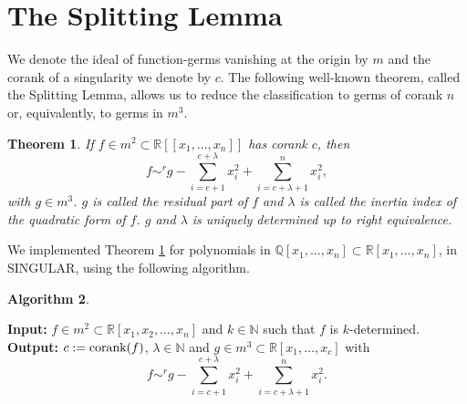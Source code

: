 \documentclass{amsproc}
\begin{document}
\section{The Splitting Lemma}
We denote the ideal of function-germs vanishing at the origin by $m$ and the corank of a singularity we denote by $c$.
The following well-known theorem, called the Splitting Lemma, allows us to reduce the classification to germs of corank $n$ or, equivalently, to germs in $m^3$.
\newtheorem{SplittingLemma}{Theorem}[section]
\newtheorem{AlgorithmSplittingLemma}[SplittingLemma]{Algorithm}
\begin{SplittingLemma}\label{SplittingLemma}
If $f\in m^2\subset \mathbb R[[x_1,\ldots,x_n]]$ has corank $c$, then
\[ f\sim^rg-\sum_{i=c+1}^{c+\lambda} x_i^2+\sum_{i=c+\lambda+1}^nx_i^2,\]
with $g\in m^3$. $g$ is called the residual part of $f$ and $\lambda$ is called the inertia index of the quadratic form of $f$. $g$ and $\lambda$ is uniquely determined up to right equivalence.
\end{SplittingLemma}
We implemented Theorem \ref{SplittingLemma} for polynomials in $\mathbb Q[x_1,\ldots,x_n]\subset\mathbb R[x_1,\ldots,x_n]$, in SINGULAR, using the following algorithm.
\begin{AlgorithmSplittingLemma} \label{AlgorithmSplittingLemma} \end{AlgorithmSplittingLemma}
\noindent\textnormal{\bf Input:} $f\in m^2\subset\mathbb R[x_1,x_2,\ldots,x_n]$ and $k\in\mathbb N$ such that $f$ is $k$-determined.\newline
\textnormal{\bf Output:} $c:=\textnormal{corank}(f)$, $\lambda\in\mathbb N$ and $g\in m^3\subset\mathbb R[x_1,\ldots,x_c]$ with \[\displaystyle f\sim^rg-\sum_{i=c+1}^{c+\lambda} x_i^2+\sum_{i=c+\lambda+1}^nx_i^2.\]
\end{document}
